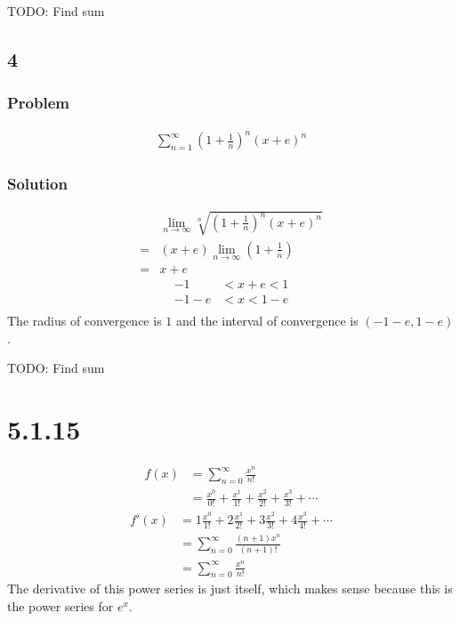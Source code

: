 \documentclass[12pt]{article}
\newcommand{\round}[1]{\left(       #1 \right)      }
\begin{document}
TODO: Find sum


\subsection*{4}
\subsubsection*{Problem}
\begin{align*}
    \sum_{n=1}^\infty \round{1+\frac{1}{n}}^n (x+e)^n
\end{align*}

\subsubsection*{Solution}
\begin{align*}
     & \lim_{n\to\infty} \sqrt[n]{\round{1+\frac{1}{n}}^n (x+e)^n} \\
    =& (x+e) \lim_{n\to\infty} \round{1+\frac{1}{n}} \\
    =& x+e
\end{align*}
\begin{align*}
    -1 &< x+e < 1 \\
    -1-e &< x < 1-e \\
\end{align*}
The radius of convergence is $1$ and the interval of convergence is $(-1-e, 1-e)$.

TODO: Find sum


\section*{5.1.15}
\begin{align*}
    f(x) &= \sum_{n=0}^\infty \frac{x^n}{n!} \\
    &= \frac{x^0}{0!} + \frac{x^1}{1!} + \frac{x^2}{2!} + \frac{x^3}{3!} + \cdots
\end{align*}
\begin{align*}
    f'(x) &= 1\frac{x^0}{1!} + 2\frac{x^1}{2!} + 3\frac{x^2}{3!} + 4\frac{x^3}{4!} + \cdots \\
    &= \sum_{n=0}^\infty \frac{(n+1)x^n}{(n+1)!} \\
    &= \sum_{n=0}^\infty \frac{x^n}{n!}
\end{align*}
The derivative of this power series is just itself, which makes sense because this is the power series for $e^x$.
\end{document}
